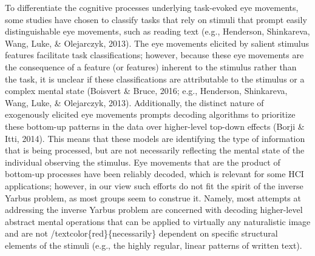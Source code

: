 \documentclass[
  english,
  man, donotrepeattitle,floatsintext]{apa6}
\begin{document}
To differentiate the cognitive processes underlying task-evoked eye movements, some studies have chosen to classify tasks that rely on stimuli that prompt easily distinguishable eye movements, such as reading text (e.g., Henderson, Shinkareva, Wang, Luke, \& Olejarczyk, 2013). The eye movements elicited by salient stimulus features facilitate task classifications; however, because these eye movements are the consequence of a feature (or features) inherent to the stimulus rather than the task, it is unclear if these classifications are attributable to the stimulus or a complex mental state (Boisvert \& Bruce, 2016; e.g., Henderson, Shinkareva, Wang, Luke, \& Olejarczyk, 2013). Additionally, the distinct nature of exogenously elicited eye movements prompts decoding algorithms to prioritize these bottom-up patterns in the data over higher-level top-down effects (Borji \& Itti, 2014). This means that these models are identifying the type of information that is being processed, but are not necessarily reflecting the mental state of the individual observing the stimulus. Eye movements that are the product of bottom-up processes have been reliably decoded, which is relevant for some HCI applications; however, in our view such efforts do not fit the spirit of the inverse Yarbus problem, as most groups seem to construe it. Namely, most attempts at addressing the inverse Yarbus problem are concerned with decoding higher-level abstract mental operations that can be applied to virtually any naturalistic image and are not /textcolor\{red\}\{necessarily\} dependent on specific structural elements of the stimuli (e.g., the highly regular, linear patterns of written text).
\end{document}
